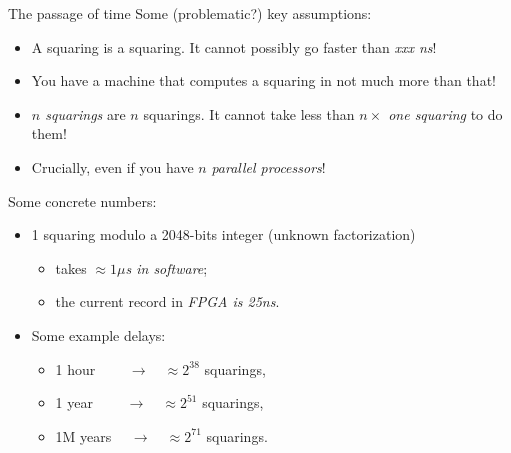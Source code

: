 \documentclass[aspectratio=169]{beamer}
\begin{document}
\begin{frame}{The passage of time}
  Some (problematic?) key assumptions:
  \begin{itemize}
  \item<+-> A squaring is a squaring. It cannot possibly go faster than \emph{xxx ns}!
  \item<+-> You have a machine that computes a squaring in not much
    more than that!
  \item<+-> \emph{$n$ squarings} are $n$ squarings. It cannot take less
    than \emph{$n \times $ one squaring} to do them!
  \item<+-> Crucially, even if you have $n$ \emph{parallel processors}!
  \end{itemize}
  
  \medskip\pause

  Some concrete numbers:
  \begin{itemize}
  \item 1 squaring modulo a 2048-bits integer (unknown factorization)
    \begin{itemize}
    \item takes \emph{$\approx 1\mu$s in software};
    \item the current record in \emph{FPGA is 25ns}.
    \end{itemize}
  \item Some example delays:
    \begin{itemize}
    \item 1 hour $\qquad\rightarrow\quad\approx 2^{38}$ squarings,
    \item 1 year $\qquad\rightarrow\quad\approx 2^{51}$ squarings,
    \item 1M years $\quad\rightarrow\quad\approx 2^{71}$ squarings.
    \end{itemize}
  \end{itemize}
\end{frame}

\end{document}
